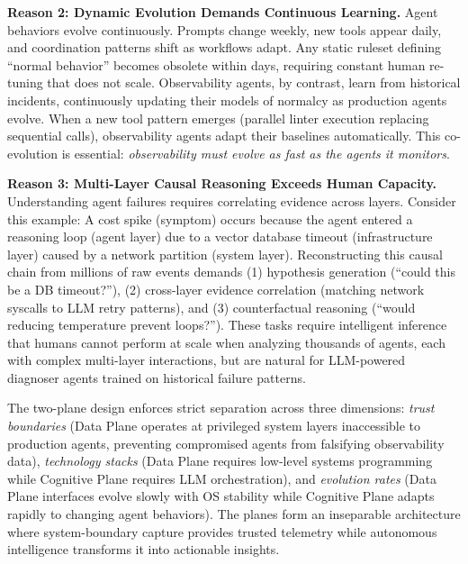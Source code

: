 \documentclass[sigplan,screen,9pt]{acmart}
\begin{document}
\textbf{Reason 2: Dynamic Evolution Demands Continuous Learning.} Agent behaviors evolve continuously. Prompts change weekly, new tools appear daily, and coordination patterns shift as workflows adapt. Any static ruleset defining ``normal behavior'' becomes obsolete within days, requiring constant human re-tuning that does not scale. Observability agents, by contrast, learn from historical incidents, continuously updating their models of normalcy as production agents evolve. When a new tool pattern emerges (parallel linter execution replacing sequential calls), observability agents adapt their baselines automatically. This co-evolution is essential: \emph{observability must evolve as fast as the agents it monitors}.

\textbf{Reason 3: Multi-Layer Causal Reasoning Exceeds Human Capacity.} Understanding agent failures requires correlating evidence across layers. Consider this example: A cost spike (symptom) occurs because the agent entered a reasoning loop (agent layer) due to a vector database timeout (infrastructure layer) caused by a network partition (system layer). Reconstructing this causal chain from millions of raw events demands (1) hypothesis generation (``could this be a DB timeout?''), (2) cross-layer evidence correlation (matching network syscalls to LLM retry patterns), and (3) counterfactual reasoning (``would reducing temperature prevent loops?''). These tasks require intelligent inference that humans cannot perform at scale when analyzing thousands of agents, each with complex multi-layer interactions, but are natural for LLM-powered diagnoser agents trained on historical failure patterns.

The two-plane design enforces strict separation across three dimensions: \emph{trust boundaries} (Data Plane operates at privileged system layers inaccessible to production agents, preventing compromised agents from falsifying observability data), \emph{technology stacks} (Data Plane requires low-level systems programming while Cognitive Plane requires LLM orchestration), and \emph{evolution rates} (Data Plane interfaces evolve slowly with OS stability while Cognitive Plane adapts rapidly to changing agent behaviors). The planes form an inseparable architecture where system-boundary capture provides trusted telemetry while autonomous intelligence transforms it into actionable insights.

\end{document}
